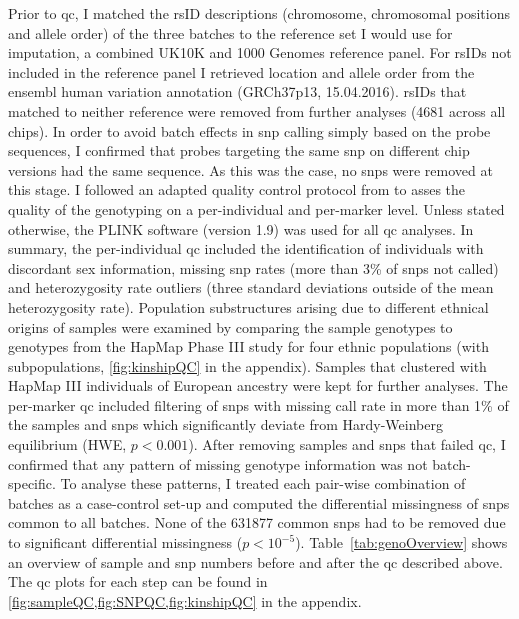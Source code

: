 Prior to \gls{qc}, I matched the rsID descriptions (chromosome, chromosomal positions and allele order) of the three batches to the reference set I would use for imputation, a combined UK10K \citep{UK10KConsortium2015} and \num{1000} Genomes \citep{1000Genomes2015} reference panel. For rsIDs not included in the reference panel I retrieved location and allele order from the ensembl human variation annotation (GRCh37p13, 15.04.2016). rsIDs that matched to neither reference were removed from further analyses (\num{4681} across all chips). In order to avoid batch effects in \gls{snp} calling simply based on the probe sequences, I confirmed that probes targeting the same \gls{snp} on different chip versions had the same sequence. As this was the case, no \glspl{snp} were removed at this stage. 
I followed an adapted quality control protocol from \citet{Anderson2010} to asses the quality of the genotyping on a per-individual and per-marker level. Unless stated otherwise, the PLINK software (version 1.9) \citep{Purcell2007, Chang2015} was used for all \gls{qc} analyses. In summary, the per-individual \gls{qc} included the identification of individuals with discordant sex information, missing \gls{snp} rates (more than 3\% of \glspl{snp} not called) and heterozygosity rate outliers (three standard deviations outside of the mean heterozygosity rate). Population substructures arising due to different ethnical origins of samples were examined by comparing the sample genotypes to genotypes from the HapMap Phase III study \citep{HapMap2005} for four ethnic populations (with subpopulations, \cref{fig:kinshipQC} in the appendix). Samples that clustered with HapMap III individuals of European ancestry were kept for further analyses. The per-marker \gls{qc} included filtering of \glspl{snp} with missing call rate in more than \num{1}\% of the samples and \glspl{snp} which significantly deviate from Hardy-Weinberg equilibrium (HWE, \(p < 0.001\)). After removing samples and \glspl{snp} that failed \gls{qc}, I confirmed that any pattern of missing genotype information was not batch-specific. To analyse these patterns, I treated each pair-wise combination of batches as a case-control set-up and computed the differential missingness of \glspl{snp} common to all batches. None of the \num{631877} common \glspl{snp} had to be removed due to significant differential missingness (\(p < 10^{-5}\)). Table~\ref{tab:genoOverview} shows an overview of sample and \gls{snp} numbers before and after the \gls{qc} described above. The \gls{qc} plots for each step can be found in \cref{fig:sampleQC,fig:SNPQC,fig:kinshipQC} in the appendix. 

